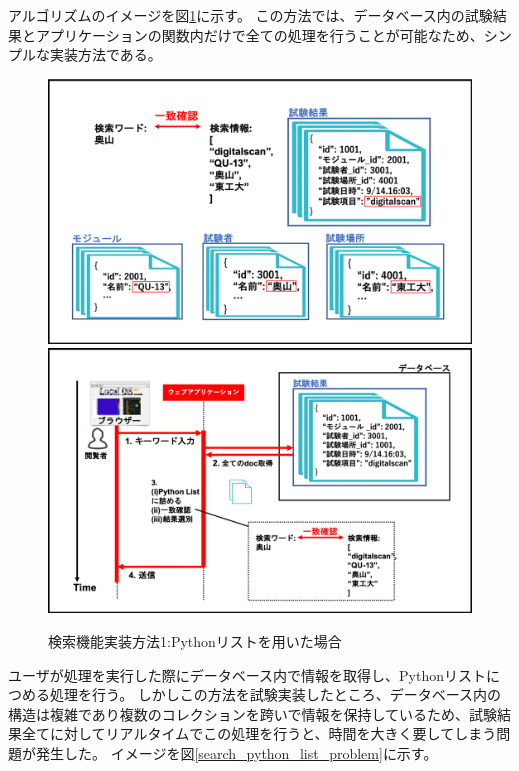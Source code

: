アルゴリズムのイメージを図\ref{search_python_list}に示す。
この方法では、データベース内の試験結果とアプリケーションの関数内だけで全ての処理を行うことが可能なため、シンプルな実装方法である。

\begin{figure}[bpt]
  \begin{center}
    \includegraphics[width=16cm]{search_python_list}
    \includegraphics[width=16cm]{search_python_list_flow}
  \caption[検索機能実装方法1:Pythonリストを用いた場合]{検索機能実装方法1:Pythonリストを用いた場合}
  \label{search_python_list}
  \end{center}
\end{figure}

ユーザが処理を実行した際にデータベース内で情報を取得し、Pythonリストにつめる処理を行う。
しかしこの方法を試験実装したところ、データベース内の構造は複雑であり複数のコレクションを跨いで情報を保持しているため、試験結果全てに対してリアルタイムでこの処理を行うと、時間を大きく要してしまう問題が発生した。
イメージを図\ref{search_python_list_problem}に示す。

